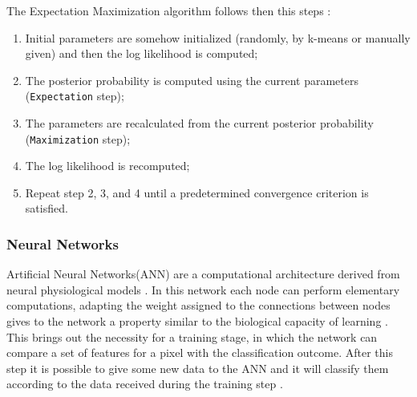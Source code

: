 \documentclass{standalone}
\begin{document}
\begin{itemize}
        The Expectation Maximization algorithm follows then this steps \cite{ART:Qiao}:
        \begin{enumerate}
            \item Initial parameters are somehow initialized (randomly, by k-means or manually given) and then the log likelihood is computed;
            \item The posterior probability is computed using the current parameters (\texttt{Expectation} step);
            \item The parameters are recalculated from the current posterior probability (\texttt{Maximization} step);
            \item The log likelihood is recomputed;
            \item Repeat step 2, 3, and 4 until a predetermined convergence criterion is satisfied.
        \end{enumerate} 
        
        
        
  \end{itemize}


\subsubsection{Neural Networks}
Artificial Neural Networks(ANN) are a computational architecture derived from neural physiological models \cite{mastersthesis:Biondi}.  In this network each node can perform elementary computations, adapting the weight assigned to the connections between nodes gives to the network a property similar to the biological capacity of learning \cite{ART:Pham}.
This brings out the necessity for a training stage, in which the network can compare a set of features for a pixel with the classification outcome. After this step it is possible to give some new data to the ANN and it will classify them according to the data received during the training step \cite{ART:Withey}.
\end{document}
